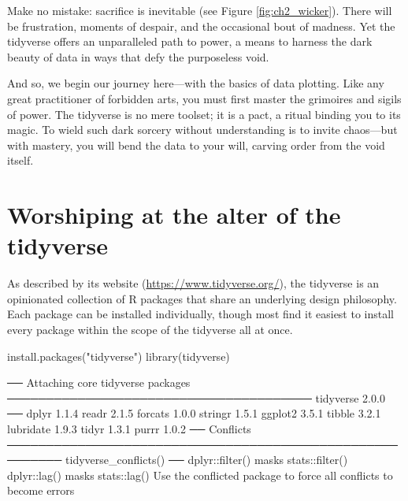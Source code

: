Make no mistake: sacrifice is inevitable (see Figure \ref{fig:ch2_wicker}). There will be frustration, moments of despair, and the occasional bout of madness. Yet the tidyverse offers an unparalleled path to power, a means to harness the dark beauty of data in ways that defy the purposeless void.

And so, we begin our journey here—with the basics of data plotting. Like any great practitioner of forbidden arts, you must first master the grimoires and sigils of power. The tidyverse is no mere toolset; it is a pact, a ritual binding you to its magic. To wield such dark sorcery without understanding is to invite chaos—but with mastery, you will bend the data to your will, carving order from the void itself.


\section{Worshiping at the alter of the tidyverse}
\label{sec:tidyverse}

As described by its website (\url{https://www.tidyverse.org/}), the \gls{tidyverse} is an opinionated collection of R packages that share an underlying design philosophy. Each package can be installed individually, though most find it easiest to install every package within the scope of the tidyverse all at once.


\begin{inR}
install.packages("tidyverse")
library(tidyverse)
\end{inR}


\begin{outR}
── Attaching core tidyverse packages ─────────────────────────────────────── tidyverse 2.0.0 ──
dplyr     1.1.4     readr     2.1.5
forcats   1.0.0     stringr   1.5.1
ggplot2   3.5.1     tibble    3.2.1
lubridate 1.9.3     tidyr     1.3.1
purrr     1.0.2     
── Conflicts ───────────────────────────────────────────────────────── tidyverse_conflicts() ──
dplyr::filter() masks stats::filter()
dplyr::lag()    masks stats::lag()
Use the conflicted package to force all conflicts to become errors
\end{outR}

